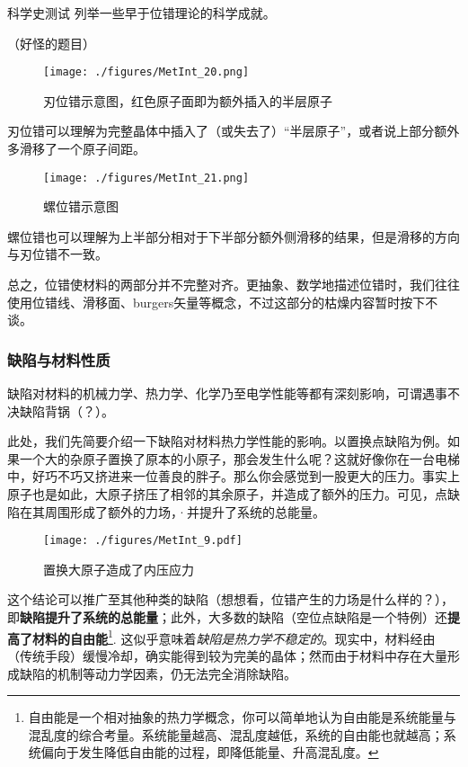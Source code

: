 \begin{exercise}{科学史测试}
列举一些早于位错理论的科学成就。

（好怪的题目）
\end{exercise}

\begin{figure}[ht]
\centering
\texttt{[image: ./figures/MetInt\_20.png]}
\caption{刃位错示意图，红色原子面即为额外插入的半层原子} \label{MetInt_fig20}
\end{figure}

刃位错可以理解为完整晶体中插入了（或失去了）“半层原子”，或者说上部分额外多滑移了一个原子间距。

\begin{figure}[ht]
\centering
\texttt{[image: ./figures/MetInt\_21.png]}
\caption{螺位错示意图} \label{MetInt_fig21}
\end{figure}

螺位错也可以理解为上半部分相对于下半部分额外侧滑移的结果，但是滑移的方向与刃位错不一致。

总之，位错使材料的两部分并不完整对齐。更抽象、数学地描述位错时，我们往往使用位错线、滑移面、burgers矢量等概念，不过这部分的枯燥内容暂时按下不谈。


\subsubsection{缺陷与材料性质}
缺陷对材料的机械力学、热力学、化学乃至电学性能等都有深刻影响，可谓遇事不决缺陷背锅（？）。

此处，我们先简要介绍一下缺陷对材料热力学性能的影响。以置换点缺陷为例。如果一个大的杂原子置换了原本的小原子，那会发生什么呢？这就好像你在一台电梯中，好巧不巧又挤进来一位善良的胖子。那么你会感觉到一股更大的压力。事实上原子也是如此，大原子挤压了相邻的其余原子，并造成了额外的压力。可见，点缺陷在其周围形成了额外的力场，·并提升了系统的总能量。
\begin{figure}[ht]
\centering
\texttt{[image: ./figures/MetInt\_9.pdf]}
\caption{置换大原子造成了内压应力} \label{MetInt_fig9}
\end{figure}

这个结论可以推广至其他种类的缺陷（想想看，位错产生的力场是什么样的？），即\textbf{缺陷提升了系统的总能量}；此外，大多数的缺陷（空位点缺陷是一个特例）还\textbf{提高了材料的自由能}\footnote{自由能是一个相对抽象的热力学概念，你可以简单地认为自由能是系统能量与混乱度的综合考量。系统能量越高、混乱度越低，系统的自由能也就越高；系统偏向于发生降低自由能的过程，即降低能量、升高混乱度。}. 这似乎意味着\textsl{缺陷是热力学不稳定的}。现实中，材料经由（传统手段）缓慢冷却，确实能得到较为完美的晶体；然而由于材料中存在大量形成缺陷的机制等动力学因素，仍无法完全消除缺陷。


